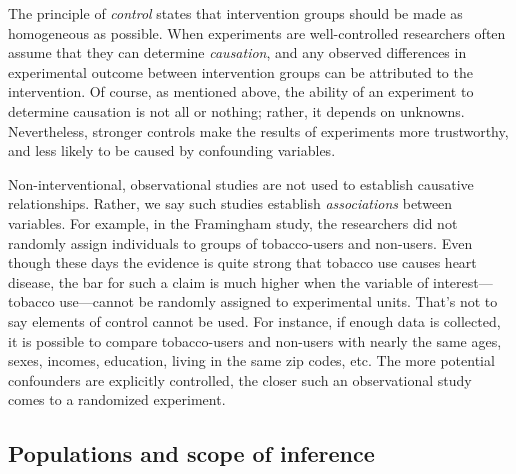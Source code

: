 \documentclass[
]{book}
\begin{document}
The principle of \emph{control} states that intervention groups should be made as homogeneous as possible. When experiments are well-controlled researchers often assume that they can determine \emph{causation}, and any observed differences in experimental outcome between intervention groups can be attributed to the intervention. Of course, as mentioned above, the ability of an experiment to determine causation is not all or nothing; rather, it depends on unknowns. Nevertheless, stronger controls make the results of experiments more trustworthy, and less likely to be caused by confounding variables.

Non-interventional, observational studies are not used to establish causative relationships. Rather, we say such studies establish \emph{associations} between variables. For example, in the Framingham study, the researchers did not randomly assign individuals to groups of tobacco-users and non-users. Even though these days the evidence is quite strong that tobacco use causes heart disease, the bar for such a claim is much higher when the variable of interest---tobacco use---cannot be randomly assigned to experimental units. That's not to say elements of control cannot be used. For instance, if enough data is collected, it is possible to compare tobacco-users and non-users with nearly the same ages, sexes, incomes, education, living in the same zip codes, etc. The more potential confounders are explicitly controlled, the closer such an observational study comes to a randomized experiment.

\hypertarget{populations-and-scope-of-inference}{%
\subsection{Populations and scope of inference}\label{populations-and-scope-of-inference}}
\end{document}
